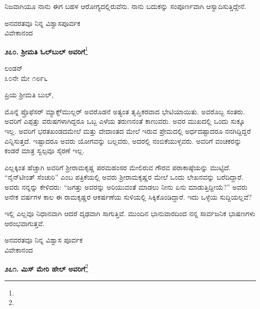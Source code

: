 \vspace{0.2cm}

ನಿಜವಾಗಿಯೂ ನಾನು ಈಗ ಬಹಳ ಆರೋಗ್ಯದಲ್ಲಿರುವೆನು. ನಾನು ಬದುಕನ್ನು ಸಂಪೂರ್ಣವಾಗಿ ಆಸ್ವಾದಿಸುತ್ತಿದ್ದೇನೆ.

\vspace{0.2cm}

{\flushright
ಅನವರತವೂ ನಿನ್ನ ವಿಶ್ವಾಸಪೂರ್ವಕ\\ವಿವೇಕಾನಂದ\par}

\begin{center}
\textbf{೨೭೦. ಶ‍್ರೀಮತಿ ಓಲ್‌ಬುಲ್‌ ಅವರಿಗೆ}\footnote{}
\end{center}

\begin{flushright}
ಲಂಡನ್\\೩೦ನೇ ಮೇ ೧೮೯೬
\end{flushright}

\noindent
ಪ್ರಿಯ ಶ‍್ರೀಮತಿ ಬುಲ್,

\vspace{0.2cm}

ಮೊನ್ನೆ ಪ್ರೊಫೆಸರ್ ಮ್ಯಾಕ್ಸ್‌ಮುಲ್ಲರ್ ಅವರೊಡನೆ ಅತ್ಯಂತ ತೃಪ್ತಿಕರವಾದ ಭೇಟಿಯಾಯಿತು. ಅವರೊಬ್ಬ ಸಂತರು. ಅವರಿಗೆ ಎಪ್ಪತ್ತು ವರುಷಗಳಾಗಿದ್ದರೂ ಒಬ್ಬ ಎಳೆಯ ತರುಣನಂತೆ ಕಾಣುವರು. ಅವರ ಮುಖದಲ್ಲಿ ಒಂದು ಸುಕ್ಕೂ ಇಲ್ಲ. ಅವರಿಗೆ ಭರತಖಂಡದಮೇಲೆ ಮತ್ತು ವೇದಾಂತದ ಮೇಲೆ ಇರುವ ಪ್ರೇಮದಲ್ಲಿ ಅರ್ಧದಷ್ಟಾದರೂ ನನಗಿದ್ದಿದ್ದರೆ ಎನ್ನಿಸುತ್ತದೆ. ಇಷ್ಟಾದರೂ ಅವರು ಯೋಗವನ್ನು ಬಲ್ಲವರು, ಅದರಲ್ಲಿ ನಂಬಿಕೆಯುಳ್ಳವರು. ಅವರಿಗೆ ವಂಚಕರನ್ನು ಕಂಡರೆ ಮಾತ್ರ ಸ್ವಲ್ಪವೂ ಸೈರಣೆ ಇಲ್ಲ.

\vspace{0.2cm}

ಎಲ್ಲಕ್ಕಿಂತ ಹೆಚ್ಚಾಗಿ ಅವರಿಗೆ ಶ‍್ರೀರಾಮಕೃಷ್ಣ ಪರಮಹಂಸರ ಮೇಲಿರುವ ಗೌರವ ಪರಾಕಾಷ್ಠೆಯನ್ನು ಮುಟ್ಟಿದೆ. ``ನೈನ್‌ಟೀಂತ್ ಸೆಂಚುರಿ'' ಎಂಬ ಪತ್ರಿಕೆಯಲ್ಲಿ ಅವರು ಶ‍್ರೀರಾಮಕೃಷ್ಣರ ಮೇಲೆ ಒಂದು ಲೇಖನವನ್ನು ಬರೆದಿದ್ದಾರೆ. ಅವರು ನನ್ನನ್ನು ಕೇಳಿದರು: ``ಜಗತ್ತು ಅವರನ್ನು ಅರಿಯುವಂತೆ ಮಾಡಲು ನೀನು ಏನು ಮಾಡುತ್ತಿದ್ದೀಯೆ?” ಅವರು ಅನೇಕ ವರ್ಷಗಳ ಕಾಲ ಈ ರಾಮಕೃಷ್ಣರ ಆಕರ್ಷಣೆಯ ಸುಳಿಯಲ್ಲಿ ಸಿಕ್ಕಿಕೊಂಡಿದ್ದಾರೆ. ಇದು ಒಳ್ಳೆಯ ಸುದ್ದಿಯಲ್ಲವೆ?

\vspace{0.2cm}

ಇಲ್ಲಿ ಎಲ್ಲವೂ ನಿಧಾನವಾಗಿ ಆದರೆ ದೃಢವಾಗಿ ಸಾಗುತ್ತಿವೆ. ಮುಂದಿನ ಭಾನುವಾರದಿಂದ ನನ್ನ ಸಾರ್ವಜನಿಕ ಭಾಷಣಗಳು ಆರಂಭವಾಗುತ್ತವೆ.

{\flushright
ಅನವರತವೂ ನಿನ್ನ ವಿಶ್ವಾಸ ಪೂರ್ವಕ\\ವಿವೇಕಾನಂದ\par}

\begin{center}
\textbf{೨೭೧. ಮಿಸ್ ಮೇರಿ ಹೇಲ್ ಅವರಿಗೆ}\footnote{}
\end{center}

